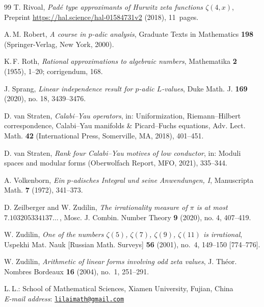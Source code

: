 \documentclass[12pt]{article}
\theoremstyle{remark}
\numberwithin{equation}{section}
\begin{document}
\begin{thebibliography}{99}
 T. Rivoal, \textit{Pad\'e type approximants of Hurwitz zeta functions $\zeta(4,x)$}, Preprint \url{https://hal.science/hal-01584731v2} (2018), 11~pages.

 A.\,M. Robert, \textit{A course in $p$-adic analysis}, Graduate Texts in Mathematics \textbf{198} (Springer-Verlag, New York, 2000).

 K.\,F. Roth, \textit{Rational approximations to algebraic numbers}, Mathematika \textbf{2} (1955), 1--20; corrigendum, 168.

 J. Sprang, \textit{Linear independence result for $p$-adic $L$-values}, Duke Math. J. \textbf{169} (2020), no. 18, 3439--3476.

 D. van Straten,
\emph{Calabi--Yau operators},
in: Uniformization, Riemann--Hilbert correspondence, Calabi--Yau manifolds \& Picard--Fuchs equations, 
Adv. Lect. Math. \textbf{42} (International Press, Somerville, MA, 2018), 401--451.

 D. van Straten,
\emph{Rank four Calabi--Yau motives of low conductor},
in: Moduli spaces and modular forms (Oberwolfach Report, MFO, 2021), 335--344.

 A. Volkenborn, \textit{Ein $p$-adisches Integral und seine Anwendungen, I}, Manuscripta Math. \textbf{7} (1972), 341--373.

 D. Zeilberger and W. Zudilin, \textit{The irrationality measure of $\pi$ is at most $7.103205334137\dots$\,}, Mosc. J. Combin. Number Theory \textbf{9} (2020), no. 4, 407--419.

 W. Zudilin, \textit{One of the numbers $\zeta(5)$, $\zeta(7)$, $\zeta(9)$, $\zeta(11)$ is irrational}, Uspekhi Mat. Nauk [Russian Math. Surveys] \textbf{56} (2001), no.~4, 149--150 [774--776].

 W. Zudilin, \textit{Arithmetic of linear forms involving odd zeta values}, J. Th\'eor. Nombres Bordeaux \textbf{16} (2004), no.~1, 251--291.

\end{thebibliography}

\vspace*{3mm}
\begin{flushright}
\begin{minipage}{148mm}\sc\footnotesize
L.\,L.: School of Mathematical Sciences, Xiamen University, Fujian, China \\
{\it E-mail address}: \href{mailto:lilaimath@gmail.com}{{\tt lilaimath@gmail.com}} \vspace*{3mm}
\end{minipage}
\end{flushright}
\end{document}
